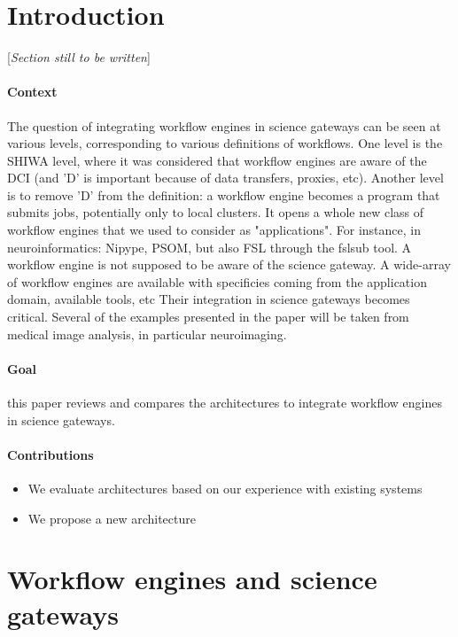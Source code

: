 \documentclass[preprint,3p,twocolumn]{elsarticle}
\newcommand{\todo}[1]{\color{blue}\xspace[\emph{#1}]\xspace\color{black}}
\begin{document}
\maketitle

\section{Introduction}

\todo{Section still to be written}

\paragraph{Context} The question of integrating workflow engines in
science gateways can be seen at various levels, corresponding to
various definitions of workflows. One level is the SHIWA level, where
it was considered that workflow engines are aware of the DCI (and 'D'
is important because of data transfers, proxies, etc). Another level
is to remove 'D' from the definition: a workflow engine becomes a
program that submits jobs, potentially only to local clusters. It
opens a whole new class of workflow engines that we used to consider
as "applications". For instance, in neuroinformatics: Nipype, PSOM,
but also FSL through the fslsub tool. A workflow engine is not
supposed to be aware of the science gateway.  A wide-array of workflow
engines are available with specificies coming from the application
domain, available tools, etc Their integration in science gateways
becomes critical. Several of the examples presented in the
paper will be taken from medical image analysis, in particular
neuroimaging.

\paragraph{Goal} this paper reviews and compares the architectures to
integrate workflow engines in science gateways.

\paragraph{Contributions}
\begin{itemize}
\item We evaluate architectures based on our experience with existing systems
\item We propose a new architecture
\end{itemize}

\section{Workflow engines and science gateways}
\end{document}
